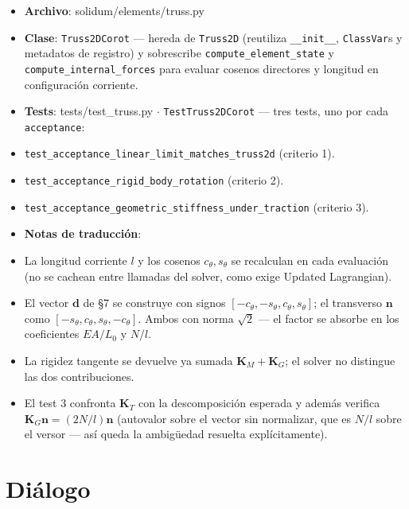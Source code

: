 \documentclass[11pt,letterpaper,oneside]{report}
\begin{document}
\begin{itemize}
  \item \textbf{Archivo}: solidum/elements/truss.py
  \item \textbf{Clase}: \texttt{Truss2DCorot} --- hereda de \texttt{Truss2D} (reutiliza \texttt{\_\_init\_\_}, \texttt{ClassVar}s y metadatos de registro) y sobrescribe \texttt{compute\_element\_state} y \texttt{compute\_internal\_forces} para evaluar cosenos directores y longitud en configuración corriente.
  \item \textbf{Tests}: tests/test\_truss.py \ensuremath{\cdot} \texttt{TestTruss2DCorot} --- tres tests, uno por cada \texttt{acceptance}:
  \item \texttt{test\_acceptance\_linear\_limit\_matches\_truss2d} (criterio 1).
  \item \texttt{test\_acceptance\_rigid\_body\_rotation} (criterio 2).
  \item \texttt{test\_acceptance\_geometric\_stiffness\_under\_traction} (criterio 3).
  \item \textbf{Notas de traducción}:
  \item La longitud corriente $l$ y los cosenos $c_\theta, s_\theta$ se recalculan en cada evaluación (no se cachean entre llamadas del solver, como exige Updated Lagrangian).
  \item El vector $\mathbf d$ de §7 se construye con signos $[-c_\theta, -s_\theta, c_\theta, s_\theta]$; el transverso $\mathbf n$ como $[-s_\theta, c_\theta, s_\theta, -c_\theta]$. Ambos con norma $\sqrt 2$ --- el factor se absorbe en los coeficientes $EA/L_0$ y $N/l$.
  \item La rigidez tangente se devuelve ya sumada $\mathbf K_M + \mathbf K_G$; el solver no distingue las dos contribuciones.
  \item El test 3 confronta $\mathbf K_T$ con la descomposición esperada y además verifica $\mathbf K_G \mathbf n = (2N/l)\mathbf n$ (autovalor sobre el vector sin normalizar, que es $N/l$ sobre el versor --- así queda la ambigüedad resuelta explícitamente).
\end{itemize}


\section{Diálogo}
\end{document}

